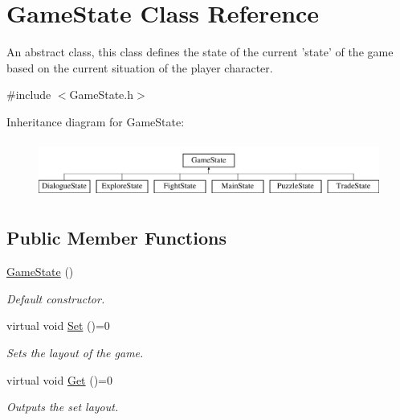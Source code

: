 \hypertarget{classGameState}{\section{Game\-State Class Reference}
\label{classGameState}
}


An abstract class, this class defines the state of the current 'state' of the game based on the current situation of the player character.  




{\ttfamily \#include $<$Game\-State.\-h$>$}

Inheritance diagram for Game\-State\-:\begin{figure}[H]
\begin{center}
\leavevmode
\includegraphics[height=1.904762cm]{classGameState}
\end{center}
\end{figure}
\subsection*{Public Member Functions}
\begin{DoxyCompactItemize}
\item 
\hypertarget{classGameState_a4fa0a2bf50315c4a35a3890a0adcee5c}{\hyperlink{classGameState_a4fa0a2bf50315c4a35a3890a0adcee5c}{Game\-State} ()}\label{classGameState_a4fa0a2bf50315c4a35a3890a0adcee5c}

\begin{DoxyCompactList}\small\item\em Default constructor. \end{DoxyCompactList}\item 
\hypertarget{classGameState_af22e9a43999f99b784a35fab85cd9208}{virtual void \hyperlink{classGameState_af22e9a43999f99b784a35fab85cd9208}{Set} ()=0}\label{classGameState_af22e9a43999f99b784a35fab85cd9208}

\begin{DoxyCompactList}\small\item\em Sets the layout of the game. \end{DoxyCompactList}\item 
\hypertarget{classGameState_a4283cb3aa5637d4815d64272843a0625}{virtual void \hyperlink{classGameState_a4283cb3aa5637d4815d64272843a0625}{Get} ()=0}\label{classGameState_a4283cb3aa5637d4815d64272843a0625}

\begin{DoxyCompactList}\small\item\em Outputs the set layout. \end{DoxyCompactList}\end{DoxyCompactItemize}
